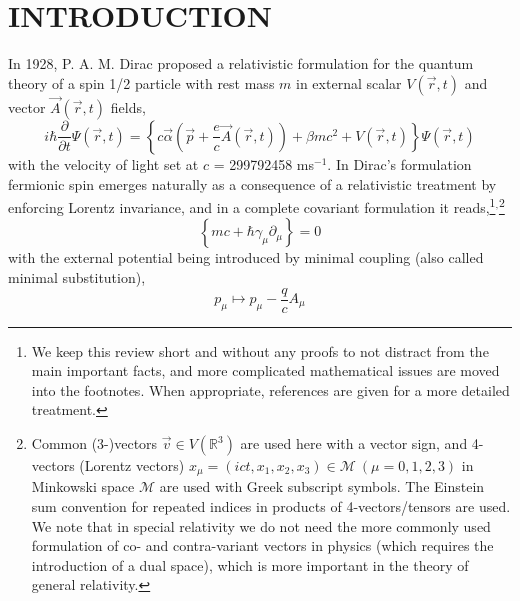 \documentclass[12pt]{article}
\begin{document}
  \makeatletter
  \renewcommand\@biblabel[1]{#1.}
  \makeatother


\renewcommand{\baselinestretch}{1.5}
\normalsize


\clearpage
\linespread{1.2}

\section{\sffamily \Large INTRODUCTION}

In 1928, P. A. M. Dirac proposed a relativistic formulation for the quantum theory of a spin 1/2 particle with rest mass $m$ in external scalar $V(\vec{r},t)$ and vector $\vec{A}(\vec{r},t)$ fields,\cite{Dirac-1928,Dirac-1929,Dirac-1930}
\begin{equation}
   i \hbar \frac{\partial}{\partial t} \Psi (\vec{r},t) = \left\{ c \vec{\alpha} \left(\vec{p} + \frac{e}{c}\vec{A}(\vec{r},t) \right) + \beta mc^2 + V(\vec{r},t) \right\} \Psi (\vec{r},t)
   \label{Dirac1}
\end{equation}
with the velocity of light set at $c$ = 299792458 ms$^{-1}$. In Dirac's formulation fermionic spin emerges naturally as a consequence of a relativistic treatment by enforcing Lorentz invariance, and
in a complete covariant formulation it reads,\footnote{We keep this review short and without any proofs to not distract from the main important facts, and more complicated mathematical issues are moved into the footnotes. When appropriate, references are given for a more detailed treatment.}$^,$\footnote{Common (3-)vectors $\vec{v}\in V(\mathbb{R}^3)$ are used here with a vector sign, and 4-vectors (Lorentz vectors) $x_\mu=(ict,x_1,x_2,x_3) \in \mathcal{M} ~(\mu = 0,1,2,3)$ in Minkowski space $\mathcal{M}$ are used with Greek subscript symbols. The Einstein sum convention for repeated indices in products of 4-vectors/tensors are used. We note that in special relativity we do not need the more commonly used formulation of co- and contra-variant vectors in physics (which requires the introduction of a dual space), which is more important in the theory of general relativity.}
\begin{equation}
   \left\{ mc + \hbar\gamma_\mu \partial_\mu \right\} = 0
   \label{Dirac2}
\end{equation}
with the external potential being introduced by minimal coupling (also called minimal substitution),
\begin{equation}
   p_\mu \mapsto p_\mu - \frac{q}{c}A_\mu
   \label{MinCoup}
\end{equation}
\end{document}
